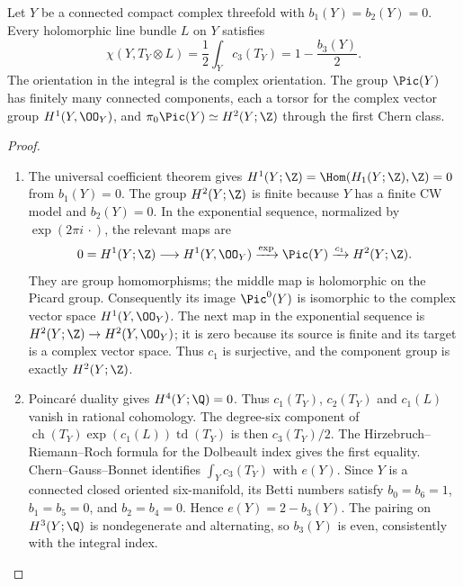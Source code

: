 \begin{proposition}\hypertarget{tag-01BN}{}\label{cdp:st:C.1.1}

Let $Y$ be a connected compact complex threefold with
$b_1(Y)=b_2(Y)=0$. Every holomorphic line bundle $L$ on $Y$ satisfies
\[
 \chi(Y,T_Y\otimes L)=\frac12\int_Yc_3(T_Y)
 =1-\frac{b_3(Y)}2.
\]
The orientation in the integral is the complex orientation. The group
$\Pic(Y)$ has finitely many connected components, each a torsor for the
complex vector group $H^1(Y,\OO_Y)$, and
$\pi_0\Pic(Y)\simeq H^2(Y;\Z)$ through the first Chern class.
\end{proposition}


\begin{proof}

\begin{enumerate}[label={$\langle1\rangle$\arabic*.},leftmargin=*]
\item The universal coefficient theorem gives
$H^1(Y;\Z)=\Hom(H_1(Y;\Z),\Z)=0$ from $b_1(Y)=0$.
The group $H^2(Y;\Z)$ is finite because $Y$ has a finite CW model and
$b_2(Y)=0$. In the exponential sequence, normalized by
$\exp(2\pi i\,\cdot)$, the relevant maps are
\[
0=H^1(Y;\Z)\longrightarrow H^1(Y,\OO_Y)
 \xrightarrow{\exp} \Pic(Y)
 \xrightarrow{c_1} H^2(Y;\Z).
\]
They are group homomorphisms; the middle map is holomorphic on the
Picard group. Consequently its image $\Pic^0(Y)$ is isomorphic to the
complex vector space $H^1(Y,\OO_Y)$. The next map in the exponential
sequence is $H^2(Y;\Z)\to H^2(Y,\OO_Y)$; it is zero because its
source is finite and its target is a complex vector space. Thus
$c_1$ is surjective, and the component group is exactly $H^2(Y;\Z)$.

\item Poincar\'e duality gives $H^4(Y;\Q)=0$. Thus
$c_1(T_Y)$, $c_2(T_Y)$ and $c_1(L)$ vanish in rational cohomology.
The degree-six component of
$\operatorname{ch}(T_Y)\exp(c_1(L))\operatorname{td}(T_Y)$ is then
$c_3(T_Y)/2$. The Hirzebruch--Riemann--Roch formula for the Dolbeault
index gives the first equality. Chern--Gauss--Bonnet identifies
$\int_Yc_3(T_Y)$ with $e(Y)$. Since $Y$ is a connected closed oriented
six-manifold, its Betti numbers satisfy
$b_0=b_6=1$, $b_1=b_5=0$, and $b_2=b_4=0$. Hence
$e(Y)=2-b_3(Y)$. The pairing on $H^3(Y;\Q)$ is nondegenerate and
alternating, so $b_3(Y)$ is even, consistently with the integral index.


\end{enumerate}
\end{proof}